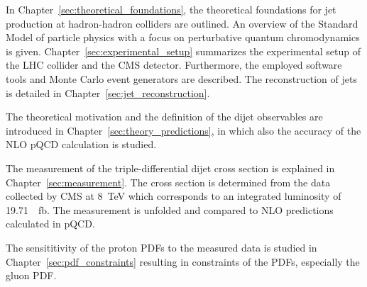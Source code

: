 In Chapter~\ref{sec:theoretical_foundations}, the theoretical foundations for
jet production at hadron-hadron colliders are outlined. An overview of the
Standard Model of particle physics with a focus on perturbative quantum
chromodynamics is given. Chapter~\ref{sec:experimental_setup} summarizes the
experimental setup of the LHC collider and the CMS detector. Furthermore, the
employed software tools and Monte Carlo event generators are described. The
reconstruction of jets is detailed in Chapter~\ref{sec:jet_reconstruction}.

The theoretical motivation and the definition of the dijet observables are
introduced in Chapter~\ref{sec:theory_predictions}, in which also the accuracy
of the NLO pQCD calculation is studied. 

The measurement of the triple-differential dijet cross section is explained in
Chapter~\ref{sec:measurement}. The cross section is determined from the data
collected by CMS at \SI{8}{\TeV} which corresponds to an integrated luminosity
of \SI{19.71}{\per \femto \barn}. The measurement is unfolded and compared to
NLO predictions calculated in pQCD.

The sensititivity of the proton PDFs to the measured data is studied in
Chapter~\ref{sec:pdf_constraints} resulting in constraints of the PDFs,
especially the gluon PDF.
